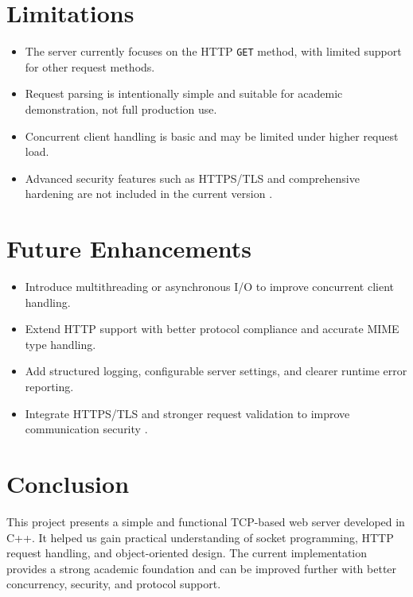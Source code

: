 \documentclass[11pt,a4paper]{article}
\begin{document}
\section{Limitations}
\begin{itemize}
    \item The server currently focuses on the HTTP \texttt{GET} method, with limited support for other request methods.
    \item Request parsing is intentionally simple and suitable for academic demonstration, not full production use.
    \item Concurrent client handling is basic and may be limited under higher request load.
    \item Advanced security features such as HTTPS/TLS and comprehensive hardening are not included in the current version \cite{nginx}.
\end{itemize}

\section{Future Enhancements}
\begin{itemize}
    \item Introduce multithreading or asynchronous I/O to improve concurrent client handling.
    \item Extend HTTP support with better protocol compliance and accurate MIME type handling.
    \item Add structured logging, configurable server settings, and clearer runtime error reporting.
    \item Integrate HTTPS/TLS and stronger request validation to improve communication security \cite{nginx}.
\end{itemize}

\section{Conclusion}
This project presents a simple and functional TCP-based web server developed in C++. It helped us gain practical understanding of socket programming, HTTP request handling, and object-oriented design. The current implementation provides a strong academic foundation and can be improved further with better concurrency, security, and protocol support.

\clearpage
\end{document}
